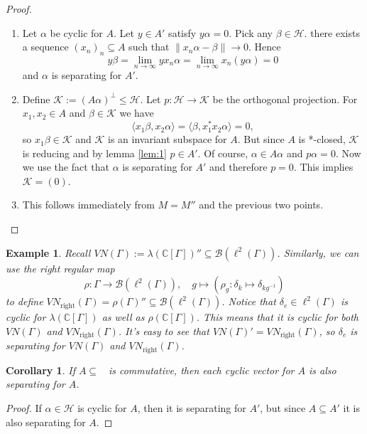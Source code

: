 \documentclass[10pt, a4paper]{article}
\newtheorem{corollary}[thm]{Corollary}
\newtheorem{example}[thm]{Example}
\newenvironment{noticeC}{%
  \tcolorbox[%
  notitle,
  empty,
  enhanced,  %
  breakable,
  coltext=black, 
  fontupper=\rmfamily,
  noparskip,
  sharp corners,
  boxrule=-1pt,  %
  frame hidden,
  left=7pt,  %
  right=7pt,
  top=5pt,
  bottom=5pt,
  before skip=2.5ex plus 2pt,
  after skip=2.5ex plus 2pt,
  overlay unbroken and last={%
  },
  ]}
{\endtcolorbox}
\newenvironment{myproof}%
  {\begin{noticeC}\begin{proof}}%
  {\end{proof}\end{noticeC}}
\newcommand{\C}{\mathbb {C}}
\DeclareMathOperator{\bh}{\mathcal{B} (\mathcal{H})}
\begin{document}
\begin{myproof}
  \begin{enumerate}
    \item Let $\alpha$ be cyclic for $A$. Let $y \in A'$ satisfy $y \alpha = 0$.
    Pick any $\beta \in \mathcal{H}$. there exists a sequence $(x_n)_n \subseteq A$ such that $\|x_n \alpha - \beta\| \to 0$.
    Hence $$y \beta = \lim_{n \to \infty} yx_n \alpha = \lim_{n \to \infty} x_n (y\alpha) = 0$$
    and $\alpha$ is separating for $A'$.
    \item Define $\mathcal{K} := (A \alpha)^{\perp} \leq \mathcal{H}$.
    Let $p: \mathcal{H} \to \mathcal{K}$ be the orthogonal projection.
    For $x_1, x_2 \in A$ and $\beta \in \mathcal{K}$ we have 
    $$\langle x_1 \beta, x_2 \alpha\rangle = \langle \beta, x_1 ^* x_2 \alpha \rangle = 0,$$
    so $x_1 \beta \in \mathcal{K}$ and $\mathcal{K}$ is an invariant subspace for $A$.
    But since $A$ is *-closed, $\mathcal{K}$ is reducing and by lemma \ref{lem:1} $p \in A'$.
    Of course, $\alpha \in A \alpha$ and $p\alpha = 0$. Now we use the fact that $\alpha$ is 
    separating for $A'$ and therefore $p = 0$. This implies $\mathcal{K} = (0)$.
    \item This follows immediately from $M = M''$ and the previous two points.
  \end{enumerate}
\end{myproof}

\begin{example}
  Recall $VN (\Gamma) := \lambda (\C [\Gamma])'' \subseteq \mathcal{B} (\ell^2 (\Gamma))$.
  Similarly, we can use the right regular map 
  $$\rho: \Gamma \to \mathcal{B} (\ell^2 (\Gamma)),\quad g \mapsto (\rho_g: \delta_k \mapsto \delta_{kg^{-1}})$$
  to define $VN_{\mathrm{right}} (\Gamma) = \rho(\Gamma)'' \subseteq \mathcal{B} (\ell^2 (\Gamma))$.
  Notice that $\delta_e \in \ell^2 (\Gamma)$ is cyclic for $\lambda (\C [\Gamma])$ as well as $\rho(\C[\Gamma])$.
  This means that it is cyclic for both $VN(\Gamma)$ and $VN_{\mathrm{right}} (\Gamma)$.
  It's easy to see that $VN(\Gamma)' = VN_{\mathrm{right}} (\Gamma)$, so $\delta_e$
  is separating for $VN(\Gamma)$ and $VN_{\mathrm{right}} (\Gamma)$.
\end{example}

\begin{corollary}
  If $A \subseteq \bh$ is commutative, then each cyclic vector for $A$ is also separating for $A$.
\end{corollary}

\begin{myproof}
  If $\alpha \in \mathcal{H}$ is cyclic for $A$, then it is separating for $A'$, 
  but since $A \subseteq A'$ it is also separating for $A$.
\end{myproof}
\end{document}
